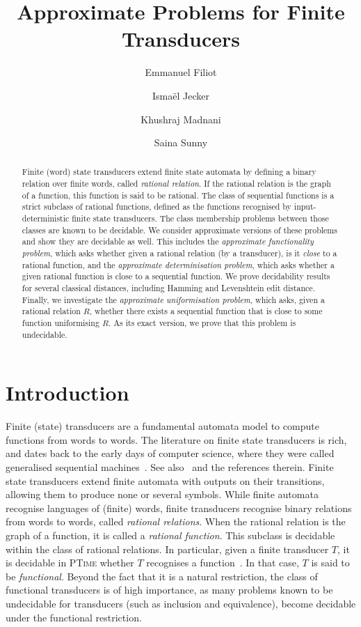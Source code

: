 \documentclass[a4paper,UKenglish,cleveref, autoref, thm-restate,authorcolumns, colorlinks]{lipics-v2021}
\title{Approximate Problems for Finite Transducers}
\author{Emmanuel Filiot}{Université libre de Bruxelles}{efiliot@ulb.e}{https://orcid.org/0000-0002-2520-5630}{He is a senior research associate at the National Fund for Scientific Research (F.R.S.-FNRS) in Belgium. His work is supported by the FNRS project T011724F.}
\author{Isma\"el Jecker}{Université de Franche-Comté}{ismael.jecker@gmail.com}{https://orcid.org/0000-0002-6527-4470}{}
\author{Khushraj Madnani}{Max Planck Institute for Software Systems}{kmadnani@mpi-sws.org}{https://orcid.org/0000-0003-0629-3847}{}
\author{Saina Sunny}{Indian Institute of Technology Goa}{saina19231102@iitgoa.ac.in}{https://orcid.org/0009-0005-1366-0168}{}
\begin{document}
\maketitle

\begin{abstract}
    Finite (word) state transducers extend finite state automata by defining a binary relation over finite words, called \emph{rational  relation}. If the rational relation is the graph of a function, this  function is said to be rational. The class of sequential functions is a strict subclass of rational functions, defined as the functions
    recognised by input-deterministic finite state
    transducers. The class membership problems between those classes
    are known to be decidable. We consider approximate versions of
    these problems and show they are decidable as well. This includes
    the \emph{approximate functionality problem}, which asks whether
    given a rational relation (by a transducer), is it \emph{close} to a
    rational function, and the \emph{approximate determinisation problem}, which
    asks whether a given rational function is close to a sequential
    function. We prove decidability results for several classical
    distances, including Hamming and Levenshtein edit distance. Finally, we
    investigate the \emph{approximate uniformisation problem}, which
    asks, given a rational relation $R$, whether there exists a sequential
    function that is close to some function uniformising $R$. As its
    exact version, we prove that this problem is undecidable.
    
\end{abstract}

\section{Introduction}

Finite (state) transducers are a fundamental automata model to compute functions from words to words. The literature on finite state transducers is rich, and dates back to the early days of computer science, where they were called generalised sequential machines~\cite{Raney1958SequentialF,Ginsburg1968-GINACO-2}. See also~\cite{DBLP:conf/stacs/MuschollP19,DBLP:journals/siglog/FiliotR16} and the references therein. Finite state transducers extend finite automata with outputs on their transitions, allowing them to produce none or several symbols. While finite automata recognise languages of (finite) words, finite transducers recognise binary relations from words to words, called \emph{rational relations}. When the rational relation is the graph of a function, it is called a \emph{rational function}. This subclass is decidable within the class of rational relations. In particular, given a finite transducer $T$, it is decidable in \textsc{PTime} whether $T$ recognises a function~\cite{GurariI83,twinningproperty}. In that case, $T$ is said to be \emph{functional}. Beyond the fact that it is a natural restriction, the class of functional transducers is of high importance, as many problems known to be undecidable for transducers (such as inclusion and equivalence), become decidable under the functional restriction.
\end{document}
